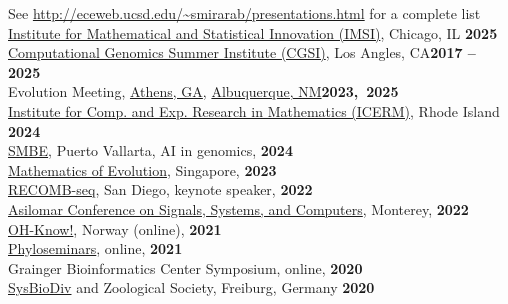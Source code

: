 \documentclass[margin,line,letterpaper]{resume}
\begin{document}
\begin{resume}
        See \url{http://eceweb.ucsd.edu/~smirarab/presentations.html} for a complete list\vspace{2mm}\\
        \href{https://www.imsi.institute/no_index/phylogenies-applications}{Institute for Mathematical and Statistical Innovation (IMSI)}, Chicago, IL \hfill \textbf{2025} \\
        \href{http://computationalgenomics.bioinformatics.ucla.edu/schedule/}{Computational Genomics Summer Institute (CGSI)}, Los Angles, CA\hfill \textbf{2017 -- 2025}\\
        Evolution Meeting, \href{https://www.evolutionmeetings.org/}{Athens, GA}, \href{https://www.evolutionsociety.org/tag/evolution-2023/}{Albuquerque, NM}\hfill \textbf{2023,~2025}\\
        \href{https://icerm.brown.edu/program/semester_program_workshop/sp-f24-w1}{Institute for Comp. and Exp. Research in Mathematics (ICERM)}, Rhode Island  \hfill \textbf{2024} \\
        \href{https://smbe2024.org/}{SMBE}, Puerto Vallarta, AI in genomics,  \hfill \textbf{2024} \\
       \href{https://ims.nus.edu.sg/events/mathematics_evolution/}{Mathematics of Evolution}, Singapore,  \hfill \textbf{2023} \\
       \href{https://recomb-seq.github.io/history/}{RECOMB-seq}, San Diego, keynote speaker, \hfill \textbf{2022} \\
       \href{https://cmsworkshops.com/Asilomar2022/Papers/ViewPapers.asp?PaperNum=1126&Mode=2}{Asilomar Conference on Signals, Systems, and Computers}, Monterey, \hfill \textbf{2022} \\
  \href{https://youtu.be/jYt28lTkAvg}{OH-Know!}, Norway (online),  \hfill \textbf{2021} \\
  \href{https://www.youtube.com/watch?v=pjCXxexKjus}{Phyloseminars}, online, \hfill \textbf{2021} \\
  Grainger Bioinformatics Center Symposium, online, \hfill \textbf{2020} \\
\href{https://twitter.com/sysbiodiv}{SysBioDiv} and Zoological Society, Freiburg, Germany \hfill \textbf{2020} \\

\end{resume}
\end{document}
